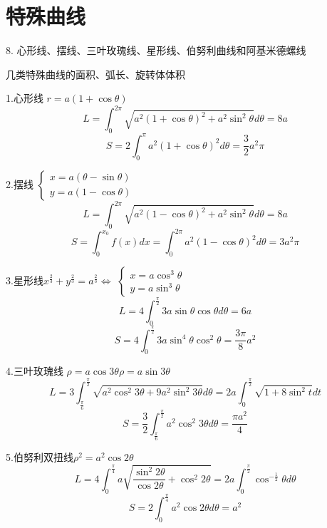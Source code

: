 \section{特殊曲线}
8. 心形线、摆线、三叶玫瑰线、星形线、伯努利曲线和阿基米德螺线
\begin{definition}\label{def: 常用曲线}
	几类特殊曲线的面积、弧长、旋转体体积
	
	1.心形线 \quad $r=a(1+\cos \theta)$
	$$L=\int_{0}^{2\pi}\sqrt{a^2(1+\cos \theta)^2+a^2\sin^2\theta}d\theta=8a$$
	$$S=2\int_{0}^{\pi}a^2(1+\cos \theta)^2d\theta=\frac{3}{2}a^2\pi$$
	
	2.摆线\quad 
	$\left\lbrace
	\begin{array}{l}
		x=a(\theta-\sin \theta)\\
		y=a(1-\cos \theta)
	\end{array}
	 \right. $
	 $$L=\int_{0}^{2\pi}\sqrt{a^2(1-\cos \theta)^2+a^2\sin^2\theta}d\theta=8a$$
	 $$S=\int_{0}^{x_{0}}f(x)dx=\int_{0}^{2\pi}a^2(1-\cos \theta)^2d\theta=3a^2\pi$$
	
	3.星形线\quad $x^{\frac{2}{3}}+y^{\frac{2}{3}}=a^{\frac{2}{3}}\Leftrightarrow$
	$\left\lbrace
	\begin{array}{l}
		x=a\cos^3\theta\\
		y=a\sin^3\theta
	\end{array}
	 \right. $
	$$L=4\int_{0}^{\frac{\pi}{2}}3a\sin\theta\cos\theta d\theta=6a$$
	$$S=4\int_{0}^{\frac{\pi}{2}}3a\sin^4\theta\cos^2\theta=\frac{3\pi}{8}a^2$$
	
	4.三叶玫瑰线 \quad $\rho=a\cos 3\theta$\quad $\rho=a\sin 3\theta$
	$$L=3\int_{\frac{\pi}{6}}^{\frac{\pi}{2}}\sqrt{a^2\cos^2 3\theta+9a^2\sin^2 3\theta}d\theta=2a\int_{0}^{\frac{\pi}{2}}\sqrt{1+8\sin^2 t}dt$$
	$$S=\frac{3}{2}\int_{\frac{\pi}{6}}^{\frac{\pi}{2}}a^2\cos^2 3\theta d\theta=\frac{\pi a^2}{4}$$
	
	5.伯努利双扭线\quad $\rho^2=a^2\cos 2\theta$
	$$L=4\int_{0}^{\frac{\pi}{4}}a\sqrt{\frac{\sin^2 2\theta}{\cos 2\theta}+\cos^2 2\theta}=2a\int_{0}^{\frac{\pi}{2}}\cos^{-\frac{1}{2}}\theta d\theta$$
	$$S=2\int_{0}^{\frac{\pi}{4}}a^2\cos 2\theta d\theta=a^2$$
\end{definition}
